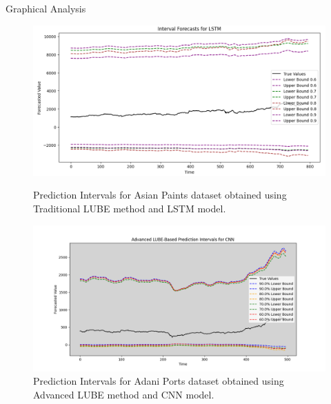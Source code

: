 \documentclass[xcolor=dvipsnames,aspectratio=169]{beamer}
\begin{document}
\begin{frame}{Graphical Analysis}

\begin{figure}
    \centering
    \begin{minipage}[b]{0.41\linewidth}
        \centering
        \includegraphics[width=\linewidth]{LUBE_LSTM_AsianPaints.png}
        \caption{Prediction Intervals for Asian Paints dataset obtained using Traditional LUBE method and LSTM model.}
        \label{fig:asianpaints}
    \end{minipage}
    \hfill
    \begin{minipage}[b]{0.50\linewidth}
        \centering
        \includegraphics[width=\linewidth]{CNN_advanced_lube_plot_ADANIPORTS.png}
        \caption{Prediction Intervals for Adani Ports dataset obtained using Advanced LUBE method and CNN model.}
        \label{fig:adaniports}
    \end{minipage}
\end{figure}

\end{frame}
\end{document}
